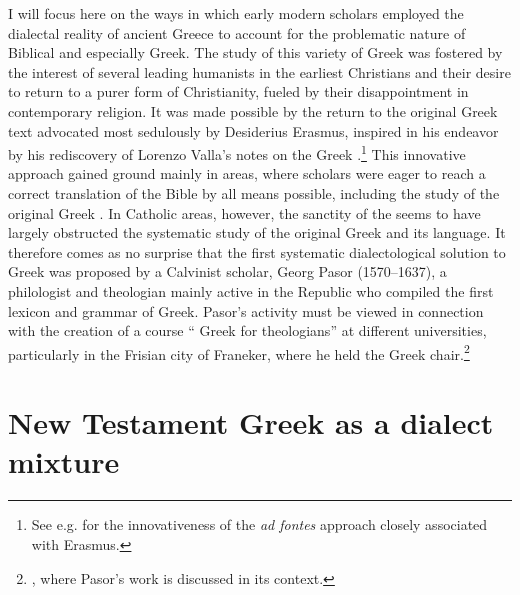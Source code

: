 I will focus here on the ways in which early modern scholars employed the dialectal reality of ancient Greece to account for the problematic nature of Biblical and especially  Greek. The study of this variety of Greek was fostered by the interest of several leading humanists in the earliest Christians and their desire to return to a purer form of Christianity, fueled by their disappointment in contemporary religion. It was made possible by the return to the original Greek text advocated most sedulously by Desiderius Erasmus, inspired in his endeavor by his rediscovery of Lorenzo Valla’s notes on the Greek .\footnote{See e.g. \citet[esp. 31]{Bentley1983} for the innovativeness of the \textit{ad fontes} approach closely associated with Erasmus.} This innovative approach gained ground mainly in  areas, where scholars were eager to reach a correct  translation of the Bible by all means possible, including the study of the original Greek . In Catholic areas, however, the sanctity of the   seems to have largely obstructed the systematic study of the original Greek  and its language. It therefore comes as no surprise that the first systematic dialectological solution to  Greek was proposed by a Calvinist scholar, Georg Pasor (1570–1637), a  philologist and theologian mainly active in the  Republic who compiled the first lexicon and grammar of  Greek. Pasor’s activity must be viewed in connection with the creation of a course “ Greek for theologians” at different  universities, particularly in the Frisian city of Franeker, where he held the Greek chair.\footnote{, where Pasor’s work is discussed in its  context.}

\section{New Testament Greek as a dialect mixture}\label{sec:4.5}

